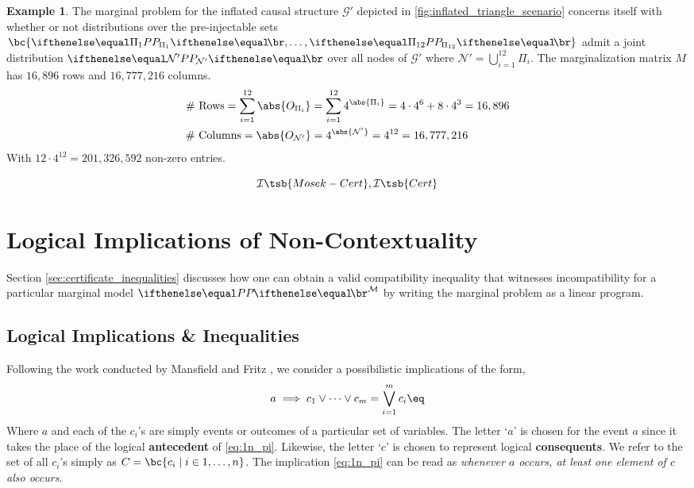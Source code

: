 \documentclass[aps, 10pt, english, twoside, pra, nofootinbib, longbibliography]{revtex4-1}
\theoremstyle{plain}
\theoremstyle{definition}
\newtheorem{example}[theorem]{Example}
\theoremstyle{remark}
\newcommand{\graph}{\mathcal{G}}
\newcommand{\nodes}{\mathcal{N}}
\newcommand{\term}[1]{\textcolor{Mahogany}{\textbf{#1}}}
\begin{document}
    \begin{example}
        The marginal problem for the inflated causal structure $\graph'$ depicted in \cref{fig:inflated_triangle_scenario} concerns itself with whether or not distributions over the pre-injectable sets $\bc{\prob[\Pi_1], \ldots, \prob[\Pi_{12}]}$ admit a joint distribution $\prob[\mathcal{\nodes'}]$ over all nodes of $\graph'$ where $\nodes' = \bigcup_{i=1}^{12}\Pi_i$. The marginalization matrix $M$ has $16,896$ rows and $16,777,216$ columns.
        \begin{align*}
            &\text{\# Rows} = \sum_{i=1}^{12} \abs{O_{\Pi_i}} = \sum_{i=1}^{12} 4^{\abs{\Pi_i}} = 4 \cdot 4^6 + 8 \cdot 4^3 = 16,896 \\
            &\text{\# Columns} = \abs{O_{\nodes'}} = 4^{\abs{\nodes'}} = 4^{12} = 16,777,216
        \end{align*}
        With $12 \cdot 4^{12} = 201,326,592$ non-zero entries.
    \end{example}


    \[ \mathcal{I}\tsb{Mosek-Cert}, \mathcal{I}\tsb{Cert} \]

    \section{Logical Implications of Non-Contextuality}

    Section \ref{sec:certificate_inequalities} discusses how one can obtain a valid compatibility inequality that witnesses incompatibility for a particular marginal model $\prob^{\mathcal{M}}$ by writing the marginal problem as a linear program.
    \subsection{Logical Implications \& Inequalities}
    \label{sec:implication_inequalities}
    Following the work conducted by Mansfield and Fritz \cite{Mansfield_2012}, we consider a possibilistic implications of the form,
    \[ a \implies c_1 \lor \cdots \lor c_m = \bigvee_{i=1}^{m} c_i \eq \label{eq:1n_pi}\]
    Where $a$ and each of the $c_i$'s are simply events or outcomes of a particular set of variables. The letter `$a$' is chosen for the event $a$ since it takes the place of the logical \term{antecedent} of \cref{eq:1n_pi}. Likewise, the letter `$c$' is chosen to represent logical \term{consequents}. We refer to the set of all $c_i$'s simply as $C = \bc{c_i \mid i \in 1, \ldots, n}$. The implication \cref{eq:1n_pi} can be read as \textit{whenever $a$ occurs, at least one element of $c$ also occurs}.
\end{document}
